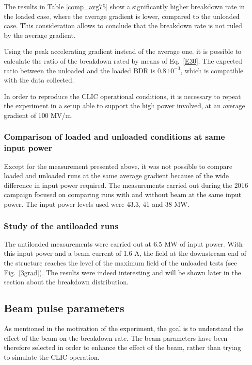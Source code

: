 The results in Table \ref{comp_avg75} show a significantly higher breakdown rate in the loaded case, where the average gradient is lower, compared to the unloaded case. This consideration allows to conclude that the breakdown rate is not ruled by the average gradient.

Using the peak accelerating gradient instead of the average one, it is possible to calculate the ratio of the breakdown rated by means of Eq.~\ref{E30}. The expected ratio between the unloaded and the loaded BDR is $0.8\,10^{-3}$, which is compatible with the data collected. 

In order to reproduce the CLIC operational conditions, it is necessary to repeat the experiment in a setup able to support the high power involved, at an average gradient of 100 MV/m.



\subsubsection{Comparison of loaded and unloaded conditions at same input power}

Except for the measurement presented above, it was not possible to compare loaded and unloaded runs at the same average gradient because of the wide difference in input power required. The measurements carried out during the 2016 campaign focused on comparing runs with and without beam at the same input power.  The input power levels used were 43.3, 41 and 38 MW. 

\subsubsection{Study of the antiloaded runs}

The antiloaded measurements were carried out at 6.5 MW of input power. With this input power and a beam current of 1.6 A, the field at the downstream end of the structure reaches the level of the maximum field of the unloaded tests (see Fig.~\ref{3grad}). The results were indeed interesting and will be shown later in the section about the breakdown distribution. 




\subsection[Beam pulse parameters]{Beam pulse parameters}

As mentioned in the motivation of the experiment, the goal is to understand the effect of the beam on the breakdown rate. The beam parameters have been therefore selected in order to enhance the effect of the beam, rather than trying to simulate the CLIC operation. 

